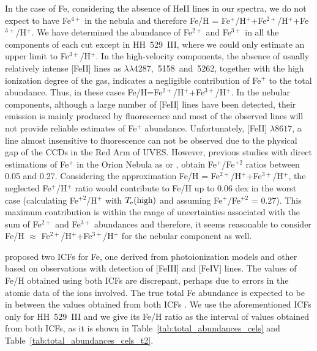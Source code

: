 \documentclass[fleqn,usenatbib]{mnras}
\begin{document}
In the case of Fe, considering the absence of He\thinspace II lines in our spectra, we do not expect to have Fe$^{4+}$ in the nebula and therefore Fe/H = Fe$^{+}$/H$^{+}$+Fe$^{2+}$/H$^{+}$+Fe$^{3+}$/H$^{+}$. We have determined the abundance of Fe$^{2+}$ and Fe$^{3+}$ in all the components of each cut except in  HH~529~III, where we could only estimate an upper limit to Fe$^{3+}$/H$^{+}$. In the high-velocity components, the absence of usually relatively intense [Fe\thinspace II] lines as $\lambda \lambda$4287,~5158~and~5262, together with the high ionization degree of the gas, indicates a negligible contribution of Fe$^{+}$ to the total abundance. Thus, in these cases Fe/H=Fe$^{2+}$/H$^{+}$+Fe$^{3+}$/H$^{+}$. In the nebular components, although a large number of [Fe\thinspace II] lines have been detected, their emission is mainly produced by fluorescence \citep{rodriguez99, verner00} and most of the observed lines will not provide reliable estimates of Fe$^{+}$ abundance. Unfortunately,  [Fe\thinspace II] $\lambda 8617$, a line almost insensitive to fluorescence  \citep{Lucy95,Baldwin96} can not be observed due to the physical gap of the CCDs in the Red Arm of UVES. However, previous studies with direct estimations of Fe$^{+}$ in the Orion Nebula as \citet{rodriguez02} or \citet{mesadelgado09}, obtain Fe$^{+}$/Fe$^{+2}$ ratios between 0.05 and 0.27. Considering the approximation Fe/H = Fe$^{2+}$/H$^{+}$+Fe$^{3+}$/H$^{+}$, the neglected Fe$^{+}$/H$^{+}$ ratio would contribute to Fe/H up to 0.06 dex in the worst case (calculating Fe$^{+2}$/H$^{+}$ with $T_{\rm e}(\text{high})$ and assuming Fe$^{+}$/Fe$^{+2}$ = 0.27). This maximum contribution is within the range of uncertainties associated with the sum of Fe$^{2+}$ and Fe$^{3+}$ abundances and therefore, it seems reasonable to consider Fe/H $\approx$ Fe$^{2+}$/H$^{+}$+Fe$^{3+}$/H$^{+}$ for the nebular component as well.

\citet{rodriguez05} proposed two ICFs for Fe, one derived from photoionization models and other based on observations with detection of [Fe\thinspace III] and [Fe\thinspace IV] lines. The values of Fe/H obtained using both ICFs are discrepant, perhaps due to errors in the atomic data of the ions involved. The true total Fe abundance is expected to be in between the values obtained from both ICFs \citep{rodriguez05,delgadoingladaetal14}. We use the aforementioned ICFs only for HH~529~III and we give its Fe/H ratio as the interval of values obtained from both ICFs, as it is shown in Table~\ref{tab:total_abundances_cels} and Table~\ref{tab:total_abundances_cels_t2}.
\end{document}
